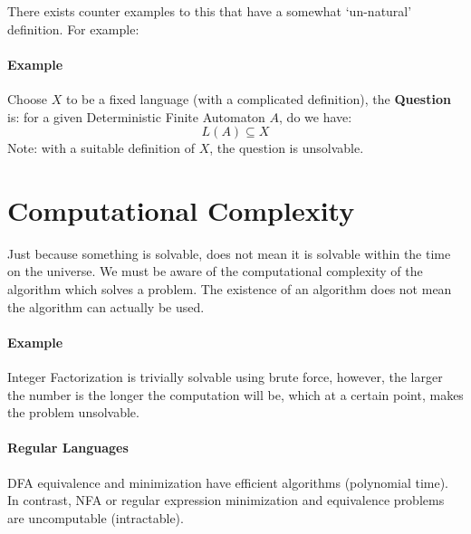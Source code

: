 \documentclass[12pt]{book}
\begin{document}
There exists counter examples to this that have a somewhat `un-natural' definition. For example:

\paragraph{Example}
Choose $X$ to be a fixed language (with a complicated definition), the \textbf{Question} is: for a given Deterministic Finite Automaton $A$, 
do we have:
\[L(A) \subseteq X\]
Note: with a suitable definition of $X$, the question is unsolvable.

\section*{Computational Complexity}
Just because something is solvable, does not mean it is solvable within the time on the universe. We must be
aware of the computational complexity of the algorithm which solves a problem. The existence of an algorithm
does not mean the algorithm can actually be used.

\paragraph{Example}
Integer Factorization is trivially solvable using brute force, however, the larger the number is the longer 
the computation will be, which at a certain point, makes the problem unsolvable.

\paragraph{Regular Languages}
DFA equivalence and minimization have efficient algorithms (polynomial time). In contrast, NFA or regular expression minimization and equivalence
problems are uncomputable (intractable).
\end{document}
